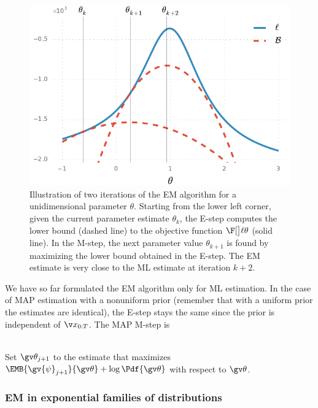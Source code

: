 \begin{figure}[htb]%
    \centering%
  	\includegraphics{img/ar1_ex_em}%
	\caption{%
Illustration of two iterations of the EM algorithm for a unidimensional parameter 
$\theta$. Starting from the lower left corner, given the current parameter estimate
$\theta_k$, the E-step computes the lower bound (dashed line) 
to the objective function $\lLH[\theta]$ (solid line). In the M-step, the next parameter 
value $\theta_{k+1}$ is found by maximizing the lower bound obtained in the E-step. The 
EM estimate is very close to the ML estimate at iteration $k+2$.
   	}
	\label{fig:ar1_em}
 \end{figure}

We have so far formulated the EM algorithm only for ML estimation. In the case
of MAP estimation with a nonuniform prior (remember that with a uniform prior the estimates are identical), 
the E-step stays the same since the prior is independent of $\X$.
The MAP M-step is
\begin{description}
\addtolength{\leftskip}{1cm}
  \item[M-step (MAP)]\hfill\\ 
  Set $\Th_{j+1}$ to the estimate that maximizes $\EMB{\gv{\psi}_{j+1}}{\Th}+\log\Pdf{\Th}$ with respect to $\Th$.
\end{description}%


 

\subsubsection*{EM in exponential families of distributions}\label{sec:EM_exp}%

